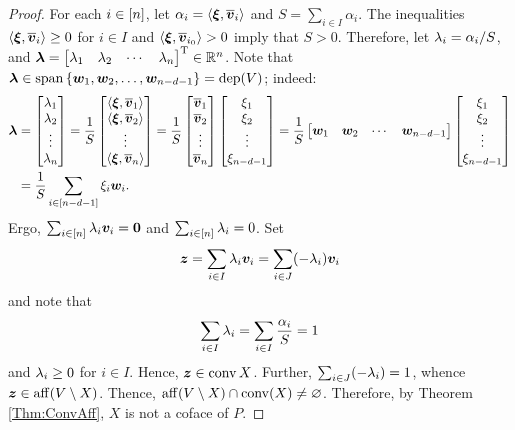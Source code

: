 \begin{proof}
    For each \(i\in\left[n\right]\), let \(\alpha_i=\left\langle\bm{\xi},\overline{\bm{v}}_i\right\rangle\) and \(S=\sum_{i\in I}\alpha_i\).  The inequalities \(\left\langle\bm{\xi},\overline{\bm{v}}_i\right\rangle\ge 0\) for \(i\in I\) and \(\left\langle\bm{\xi},\overline{\bm{v}}_{i_0}\right\rangle>0\) imply that \(S>0\).  Therefore, let \(\lambda_i=\alpha_i/S\), and \(\bm{\lambda}={\begin{bmatrix}\lambda_1&\lambda_2&\cdots&\lambda_n\end{bmatrix}}^{\mathrm{T}}\in\mathbb{R}^{n}\).  Note that \(\bm{\lambda}\in\operatorname{span}\left\{\bm{w}_1,\bm{w}_2,\dotsc,\bm{w}_{n-d-1}\right\}=\operatorname{dep}(V)\); indeed:
        \begin{align*}
            \bm{\lambda}
                &=
                \begin{bmatrix}\lambda_1\\ \lambda_2\\ \vdots\\ \lambda_n\end{bmatrix}
                    =\frac1S
                    \begin{bmatrix}
                        \left\langle\bm{\xi},\overline{\bm{v}}_1\right\rangle\\ \left\langle\bm{\xi},\overline{\bm{v}}_2\right\rangle\\ \vdots\\ \left\langle\bm{\xi},\overline{\bm{v}}_n\right\rangle
                    \end{bmatrix}
                    =\frac1S
                    \begin{bmatrix}\overline{\bm{v}}_1\\ \overline{\bm{v}}_2\\ \vdots\\ \overline{\bm{v}}_n\end{bmatrix}
                    \begin{bmatrix}\xi_1\\ \xi_2\\ \vdots\\ \xi_{n-d-1}\end{bmatrix}
                    =\frac1S
                    \begin{bmatrix}\bm{w}_1&\bm{w}_2&\cdots&\bm{w}_{n-d-1}\end{bmatrix}
                    \begin{bmatrix}\xi_1\\ \xi_2\\ \vdots\\ \xi_{n-d-1}\end{bmatrix}\\
                &=
                \frac1S\sum_{i\in\left[n-d-1\right]}\xi_i\bm{w}_i.
        \end{align*}
    Ergo, \(\sum_{i\in\left[n\right]}\lambda_i\bm{v}_i=\bm{0}\) and \(\sum_{i\in\left[n\right]}\lambda_i=0\).  Set
        \[
            \bm{z}
                =
                \sum_{i\in I}\lambda_i\bm{v}_i
                =
                \sum_{i\in J}(-\lambda_i)\bm{v}_i
        \]
    and note that
        \[
            \sum_{i\in I}\lambda_i
                =
                \sum_{i\in I}\frac{\alpha_i}S
                =1
        \]
    and \(\lambda_i\ge0\) for \(i\in I\). Hence, \(\bm{z}\in\operatorname{conv} X\).  Further, \(\sum_{i\in J}(-\lambda_i)=1\), whence \(\bm{z}\in\operatorname{aff}(V\setminus X)\).  Thence, \(\operatorname{aff}(V\setminus X)\cap\operatorname{conv}(X)\ne\varnothing\).  Therefore, by Theorem \ref{Thm:ConvAff}, \(X\) is not a coface of \(P\).
\end{proof}

